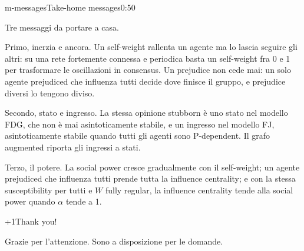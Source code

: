 \begin{slide}{m-messages}{Take-home messages}{0:50}
  \begin{discorso}
    \item Tre messaggi da portare a casa.
    \item Primo, inerzia e ancora. Un self-weight rallenta un agente ma lo lascia seguire gli altri: su una rete fortemente connessa e periodica basta un self-weight fra 0 e 1 per trasformare le oscillazioni in consensus. Un prejudice non cede mai: un solo agente prejudiced che influenza tutti decide dove finisce il gruppo, e prejudice diversi lo tengono diviso.
    \item Secondo, stato e ingresso. La stessa opinione stubborn è uno stato nel modello FDG, che non è mai asintoticamente stabile, e un ingresso nel modello FJ, asintoticamente stabile quando tutti gli agenti sono P-dependent. Il grafo augmented riporta gli ingressi a stati.
    \item Terzo, il potere. La social power cresce gradualmente con il self-weight; un agente prejudiced che influenza tutti prende tutta la influence centrality; e con la stessa susceptibility per tutti e $W$ fully regular, la influence centrality tende alla social power quando $\alpha$ tende a 1.
  \end{discorso}
\end{slide}

\begin{slidepag}{\the\numexpr{}+1\relax}{Thank you!}{}
  \begin{discorso}
    \item Grazie per l'attenzione. Sono a disposizione per le domande.
  \end{discorso}
\end{slidepag}


